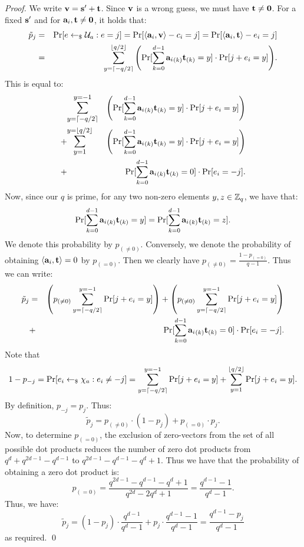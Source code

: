 \begin{proof}
We write $\mathbf{v}=\mathbf{s'}+\mathbf{t}$. Since $\mathbf{v}$ is a wrong guess, we must have $\mathbf{t}\neq\mathbf{0}$.
For a fixed $\mathbf{s'}$ and for $\mathbf{a}_i, \mathbf{t}\neq\mathbf{0}$, it holds that:
\begin{eqnarray*}
\tilde{p}_j & = & \Pr[e \sample \U_{a} : e = j]=\Pr[\dotp{\avec_i}{\vvec}-c_i=j]=\Pr[\dotp{\avec_i}{\tvec}-e_i=j]\\
& = & \sum_{y=\lceil -q/2\rceil}^{\lfloor q/2\rfloor}{\left(\Pr[\sum_{k=0}^{d-1}{{\avec_i}_{(k)}\tvec_{(k)}=y}]\cdot\Pr[j+e_i=y]\right)}.
\end{eqnarray*}
This is equal to:
\begin{eqnarray*}
& \mathlarger{\sum_{y=\lowerbound}^{y=-1}}   & {\left(\Pr[\sum_{k=0}^{d-1}{{\avec_i}_{(k)}\tvec_{(k)}=y}]\cdot\Pr[j+e_i=y]\right)}\\
+ &  \mathlarger{\sum_{y=1}^{y=\upperbound}} & {\left(\Pr[\sum_{k=0}^{d-1}{{\avec_i}_{(k)}\tvec_{(k)}=y}]\cdot\Pr[j+e_i=y]\right)}\\
+ & & \Pr[\sum_{k=0}^{d-1}{{\avec_i}_{(k)}\tvec_{(k)}=0}]\cdot\Pr[e_i=-j].
\end{eqnarray*}
Now, since our $q$ is prime, for any two non-zero elements $y,z\in\mathbb{Z}_q$, we have that:
\begin{equation*}
\Pr[\sum_{k=0}^{d-1}{{\mathbf{a}_i}_{(k)}\mathbf{t}_{(k)}}=y]=\Pr[\sum_{k=0}^{d-1}{{\mathbf{a}_i}_{(k)}\mathbf{t}_{(k)}}=z].
\end{equation*}
We denote this probability by $p_{(\neq 0)}$. Conversely, we denote the probability of obtaining 
$\langle\mathbf{a}_i,\mathbf{t}\rangle=0$ by $p_{(=0)}$. Then we clearly have $p_{(\neq 0)}=\frac{1-p_{(=0)}}{q-1}$.
Thus we can write:
\begin{eqnarray*}
\tilde{p}_j & = & \left(p_{(\neq 0)}\sum_{y=\lceil -q/2\rceil}^{y=-1}{\Pr[j+e_i=y]}\right) + \left(p_{(\neq 0)}\sum_{y=\lceil -q/2\rceil}^{y=-1}{\Pr[j+e_i=y]}\right)\\
& + &\Pr[\sum_{k=0}^{d-1}{{\mathbf{a}_i}_{(k)}\mathbf{t}_{(k)}=0}]\cdot\Pr[e_i=-j].
\end{eqnarray*}
Note that $$
1- p_{-j}=\Pr[e_i \leftarrow_{\$} \chi_{a} : e_i \not = -j]= \sum_{y=\lceil -q/2\rceil}^{y=-1}{\Pr[j+e_i=y]}+\sum_{y=1}^{\lfloor q/2\rfloor}{\Pr[j+e_i=y]}.
$$ 
By definition, $p_{-j}=p_j$. Thus:
\begin{equation*}
\tilde{p}_j=p_{(\neq 0)}\cdot(1-p_{j})+p_{(=0)}\cdot p_j.
\end{equation*}
Now, to determine $p_{(=0)}$, the exclusion of zero-vectors from the set of all possible dot products reduces the number of zero dot products from 
$q^d+q^{2d-1}-q^{d-1}$ to $q^{2d-1}-q^{d-1}-q^d+1$. Thus we have that the probability of 
obtaining a zero dot product is:
$$p_{(=0)}=\frac{q^{2d-1}-q^{d-1}-q^d+1}{q^{2d}-2q^d+1}=\frac{q^{d-1}-1}{q^d-1}.$$
Thus, we have:
$$\tilde{p}_j=(1-p_j)\cdot{\frac{q^{d-1}}{q^d-1}}+p_j\cdot\frac{q^{d-1}-1}{q^d-1}=\frac{q^{d-1}-p_j}{q^d-1}$$
as required. \qed
\end{proof}

